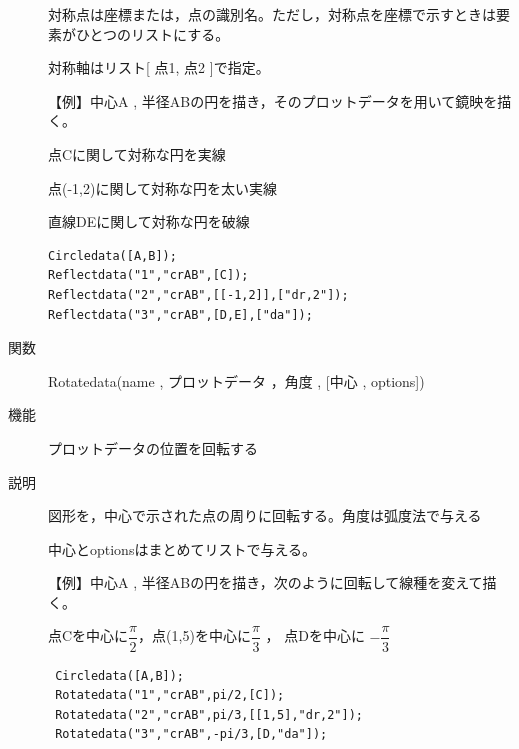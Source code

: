\documentclass[papersize,a4paper,12pt,uplatex]{jsarticle}
\begin{document}
\begin{description}
対称点は座標または，点の識別名。ただし，対称点を座標で示すときは要素がひとつのリストにする。

対称軸はリスト[ 点1, 点2 ]で指定。

\vspace{\baselineskip}
【例】中心A , 半径ABの円を描き，そのプロットデータを用いて鏡映を描く。

点Cに関して対称な円を実線

点(-1,2)に関して対称な円を太い実線

直線DEに関して対称な円を破線

\begin{verbatim}
Circledata([A,B]);
Reflectdata("1","crAB",[C]);
Reflectdata("2","crAB",[[-1,2]],["dr,2"]);
Reflectdata("3","crAB",[D,E],["da"]);
\end{verbatim}

\vspace{\baselineskip}
 \begin{center}  \end{center}


\vspace{\baselineskip}
\hypertarget{rotatedata}{}
\item[関数]Rotatedata(name , プロットデータ ，角度 , [中心 , options])
\item[機能]プロットデータの位置を回転する
\item[説明]図形を，中心で示された点の周りに回転する。角度は弧度法で与える

中心とoptionsはまとめてリストで与える。

\begin{spacing}{1.5}
【例】中心A , 半径ABの円を描き，次のように回転して線種を変えて描く。

 点Cを中心に$\dfrac{\pi}{2} $，点(1,5)を中心に$\dfrac{\pi}{3}$ ， 点Dを中心に $-\dfrac{\pi}{3} $
\end{spacing}
\begin{verbatim}
 Circledata([A,B]);
 Rotatedata("1","crAB",pi/2,[C]);
 Rotatedata("2","crAB",pi/3,[[1,5],"dr,2"]);
 Rotatedata("3","crAB",-pi/3,[D,"da"]);
\end{verbatim}
\vspace{\baselineskip}
\begin{center}\scalebox{0.9}{  }\end{center}
 

\end{description}
\end{document}
